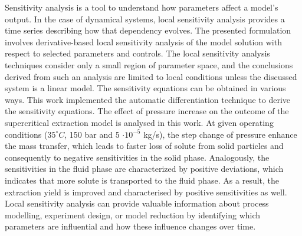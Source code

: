\documentclass[a4paper,fleqn]{cas-dc}
\begin{document}
Sensitivity analysis is a tool to understand how parameters affect a model's output. In the case of dynamical systems, local sensitivity analysis provides a time series describing how that dependency evolves. The presented formulation involves derivative-based local sensitivity analysis of the model solution with respect to selected parameters and controls. The local sensitivity analysis techniques consider only a small region of parameter space, and the conclusions derived from such an analysis are limited to local conditions unless the discussed system is a linear model. The sensitivity equations can be obtained in various ways. This work implemented the automatic differentiation technique to derive the sensitivity equations. The effect of pressure increase on the outcome of the supercritical extraction model is analysed in this work. At given operating conditions ($35^\circ C$, 150 bar and 5 $\cdot 10^{-5}$ kg/s), the step change of pressure enhance the mass transfer, which leads to faster loss of solute from solid particles and consequently to negative sensitivities in the solid phase.  Analogously, the sensitivities in the fluid phase are characterized by positive deviations, which indicates that more solute is transported to the fluid phase. As a result, the extraction yield is improved and characterised by positive sensitivities as well. Local sensitivity analysis can provide valuable information about process modelling, experiment design, or model reduction by identifying which parameters are influential and how these influence changes over time.

%



%
\end{document}
